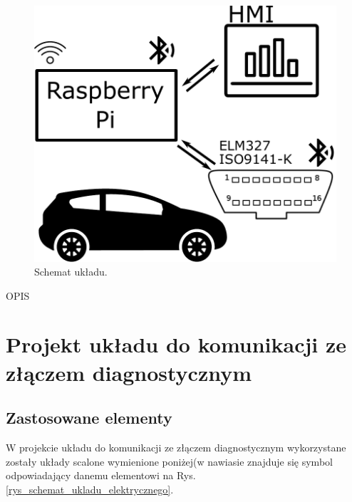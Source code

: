 \documentclass[12pt]{article} %
\numberwithin{equation}{subsection}
\numberwithin{figure}{section}
\numberwithin{table}{section}
\begin{document}
		\begin{figure}[ht]
		\centering
		\includegraphics[scale=0.8]{Images/SchematUkladu.pdf}
		\caption{Schemat układu.}
		\label{rys_schemat_ukladu}
		\end{figure}
	
	OPIS	
	
	\newpage	
	
\section{Projekt układu do komunikacji ze złączem diagnostycznym}
	\subsection{Zastosowane elementy}W projekcie układu do komunikacji ze złączem diagnostycznym wykorzystane zostały układy scalone wymienione poniżej(w nawiasie znajduje się symbol odpowiadający danemu elementowi na Rys. \ref{rys_schemat_ukladu_elektrycznego}.
	
\end{document}
